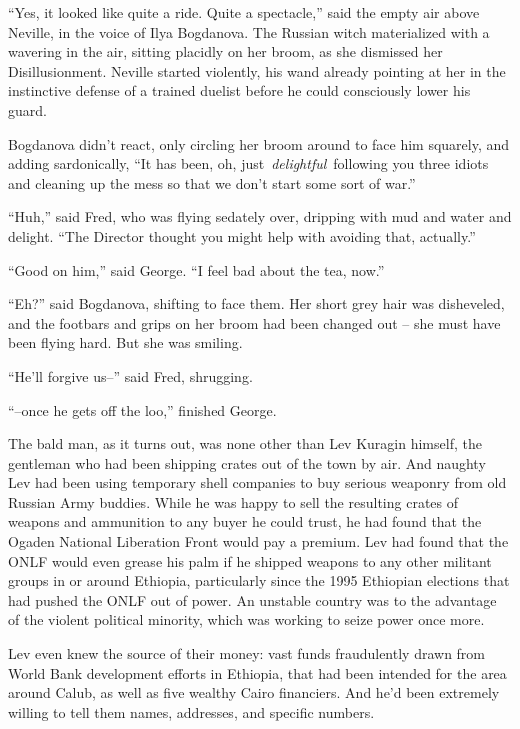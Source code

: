 ``Yes, it looked like quite a ride. Quite a spectacle,'' said the empty
air above Neville, in the voice of Ilya Bogdanova. The Russian witch
materialized with a wavering in the air, sitting placidly on her broom,
as she dismissed her Disillusionment. Neville started violently, his
wand already pointing at her in the instinctive defense of a trained
duelist before he could consciously lower his guard.

Bogdanova didn't react, only circling her broom around to face him
squarely, and adding sardonically, ``It has been, oh,
just~\emph{delightful}~following you three idiots and cleaning up the
mess so that we don't start some sort of war.''

``Huh,'' said Fred, who was flying sedately over, dripping with mud and
water and delight. ``The Director thought you might help with avoiding
that, actually.''

``Good on him,'' said George. ``I feel bad about the tea, now.''

``Eh?'' said Bogdanova, shifting to face them. Her short grey hair was
disheveled, and the footbars and grips on her broom had been changed out
-- she must have been flying hard. But she was smiling.

``He'll forgive us--'' said Fred, shrugging.

``--once he gets off the loo,'' finished George.

\mybreak

The bald man, as it turns out, was none other than Lev Kuragin himself,
the gentleman who had been shipping crates out of the town by air. And
naughty Lev had been using temporary shell companies to buy serious
weaponry from old Russian Army buddies. While he was happy to sell the
resulting crates of weapons and ammunition to any buyer he could trust,
he had found that the Ogaden National Liberation Front would pay a
premium. Lev had found that the ONLF would even grease his palm if he
shipped weapons to any other militant groups in or around Ethiopia,
particularly since the 1995 Ethiopian elections that had pushed the ONLF
out of power. An unstable country was to the advantage of the violent
political minority, which was working to seize power once more.

Lev even knew the source of their money: vast funds fraudulently drawn
from World Bank development efforts in Ethiopia, that had been intended
for the area around Calub, as well as five wealthy Cairo financiers. And
he'd been extremely willing to tell them names, addresses, and specific
numbers.

